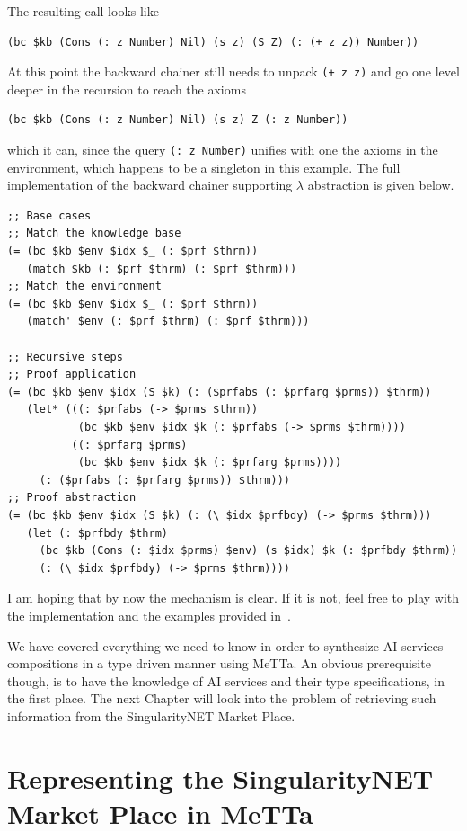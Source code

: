 \documentclass[]{report}
\begin{document}
The resulting call looks like
\begin{verbatim}
(bc $kb (Cons (: z Number) Nil) (s z) (S Z) (: (+ z z)) Number))
\end{verbatim}
At this point the backward chainer still needs to unpack
\texttt{(+ z z)} and go one level deeper in the
recursion to reach the axioms
\begin{verbatim}
(bc $kb (Cons (: z Number) Nil) (s z) Z (: z Number))
\end{verbatim}
which it can, since the query \texttt{(: z Number)}
unifies with one the axioms in the environment, which happens to be a
singleton in this example.  The full implementation of the backward
chainer supporting $\lambda$ abstraction is given below.
\begin{small}
\begin{verbatim}
;; Base cases
;; Match the knowledge base
(= (bc $kb $env $idx $_ (: $prf $thrm))
   (match $kb (: $prf $thrm) (: $prf $thrm)))
;; Match the environment
(= (bc $kb $env $idx $_ (: $prf $thrm))
   (match' $env (: $prf $thrm) (: $prf $thrm)))

;; Recursive steps
;; Proof application
(= (bc $kb $env $idx (S $k) (: ($prfabs (: $prfarg $prms)) $thrm))
   (let* (((: $prfabs (-> $prms $thrm))
           (bc $kb $env $idx $k (: $prfabs (-> $prms $thrm))))
          ((: $prfarg $prms)
           (bc $kb $env $idx $k (: $prfarg $prms))))
     (: ($prfabs (: $prfarg $prms)) $thrm)))
;; Proof abstraction
(= (bc $kb $env $idx (S $k) (: (\ $idx $prfbdy) (-> $prms $thrm)))
   (let (: $prfbdy $thrm)
     (bc $kb (Cons (: $idx $prms) $env) (s $idx) $k (: $prfbdy $thrm))
     (: (\ $idx $prfbdy) (-> $prms $thrm))))
\end{verbatim}
\end{small}
I am hoping that by now the mechanism is clear.  If it is not, feel
free to play with the implementation and the examples provided
in~\cite{TODO, TODO}.

We have covered everything we need to know in order to synthesize AI
services compositions in a type driven manner using MeTTa.  An obvious
prerequisite though, is to have the knowledge of AI services and their
type specifications, in the first place.  The next Chapter will look
into the problem of retrieving such information from the
SingularityNET Market Place.

\chapter{Representing the SingularityNET Market Place in MeTTa}
\label{chap:marketplace}
\end{document}
